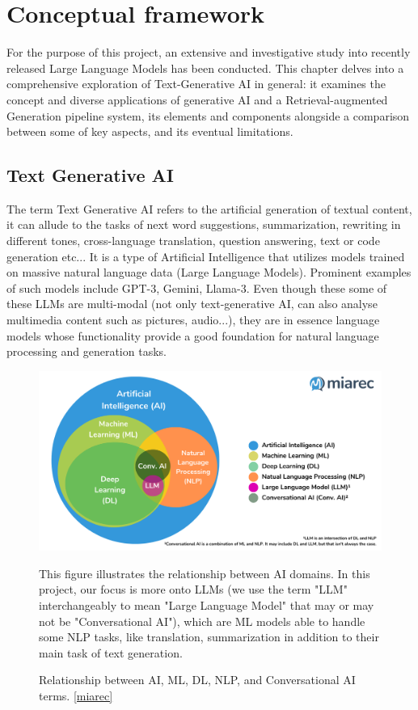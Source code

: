 \chapter{Conceptual framework}
For the purpose of this project, an extensive and investigative study into recently released Large Language Models has been conducted. This chapter delves into a comprehensive exploration of Text-Generative AI in general: it examines the concept and diverse applications of generative AI and a Retrieval-augmented Generation pipeline system, its elements and components alongside a comparison between some of key aspects, and its eventual limitations.
\newpage

\section{Text Generative AI}
The term Text Generative AI refers to the artificial generation of textual content, it can allude to the tasks of next word suggestions, summarization, rewriting in different tones, cross-language translation, question answering, text or code generation etc...
It is a type of Artificial Intelligence that utilizes models trained on massive natural language data (Large Language Models). Prominent examples of such models include GPT-3, Gemini, Llama-3. Even though these some of these LLMs are multi-modal (not only text-generative AI, can also analyse multimedia content such as pictures, audio...), they are in essence language models whose functionality provide a good foundation for natural language processing and generation tasks.
\begin{figure}[htbp]
    \centering
    \includegraphics[width=.97\linewidth]{./figures/genai-relation-diagram.png}
    \caption{Relationship between AI, ML, DL, NLP, and Conversational AI terms. \href{https://blog.miarec.com/contact-centers-ai-definition}{[miarec]}}
    \begin{flushleft}
        \small This figure illustrates the relationship between AI domains. In this project, our focus is more onto LLMs (we use the term "LLM" interchangeably to mean "Large Language Model" that may or may not be "Conversational AI"), which are ML models able to handle some NLP tasks, like translation, summarization in addition to their main task of text generation.
    \end{flushleft}
\end{figure}\newline
